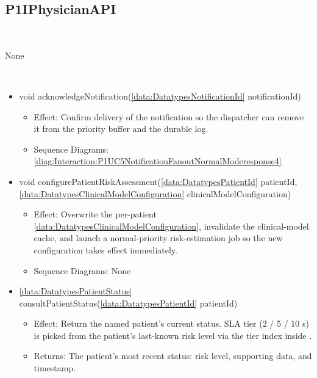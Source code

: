   \subsection{P1IPhysicianAPI}\label{int:InterfacesP1IPhysicianAPI}
    \begin{description}
      \item[Provided by:] \iconcomponent{}~
      \item[Required by:] None 
      \item[Operations:] ~
    \begin{itemize}[noitemsep,nolistsep,leftmargin=-.25cm]
      \item \textsf{void acknowledgeNotification(\ref{data:DatatypesNotificationId} notificationId)}
        \begin{itemize}[noitemsep,nolistsep]
           \item Effect: Confirm delivery of the notification so the dispatcher can remove it from the priority buffer and the durable log. 
           \item Sequence Diagrams: \cref{diag:Interaction:P1UC5NotificationFanoutNormalModeresponse4}
        \end{itemize}
      \item \textsf{void configurePatientRiskAssessment(\ref{data:DatatypesPatientId} patientId, \ref{data:DatatypesClinicalModelConfiguration} clinicalModelConfiguration)}
        \begin{itemize}[noitemsep,nolistsep]
           \item Effect: Overwrite the per-patient \ref{data:DatatypesClinicalModelConfiguration}, invalidate the clinical-model cache, and launch a normal-priority risk-estimation job so the new configuration takes effect immediately. 
           \item Sequence Diagrams: None
        \end{itemize}
      \item \textsf{\ref{data:DatatypesPatientStatus} consultPatientStatus(\ref{data:DatatypesPatientId} patientId)}
        \begin{itemize}[noitemsep,nolistsep]
           \item Effect: Return the named patient's current status. SLA tier (2 / 5 / 10 s) is picked from the patient's last-known risk level via the tier index inside . 
           \item Returns: The patient's most recent status: risk level, supporting data, and timestamp.

\end{itemize}
\end{itemize}
\end{description}
